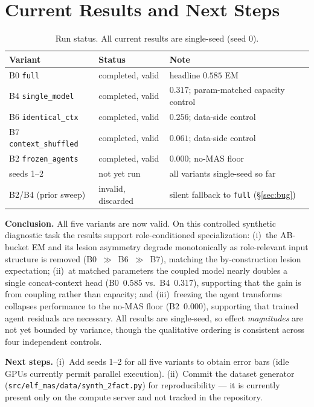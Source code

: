 \documentclass[10pt]{article}
\begin{document}
\section{Current Results and Next Steps}\label{sec:status}
\begin{table}[H]
\centering
\small
\begin{tabular}{@{}l l l@{}}
\toprule
\textbf{Variant} & \textbf{Status} & \textbf{Note} \\
\midrule
B0 \texttt{full}              & completed, valid   & headline $0.585$ EM \\
B4 \texttt{single\_model}     & completed, valid   & $0.317$; param-matched capacity control \\
B6 \texttt{identical\_ctx}    & completed, valid   & $0.256$; data-side control \\
B7 \texttt{context\_shuffled} & completed, valid   & $0.061$; data-side control \\
B2 \texttt{frozen\_agents}    & completed, valid   & $0.000$; no-MAS floor \\
seeds 1--2                    & not yet run        & all variants single-seed so far \\
\midrule
B2/B4 (prior sweep)           & invalid, discarded & silent fallback to \texttt{full} (\S\ref{sec:bug}) \\
\bottomrule
\end{tabular}
\caption{Run status. All current results are single-seed (seed 0).}
\end{table}

\noindent\textbf{Conclusion.} All five variants are now valid. On this controlled synthetic
diagnostic task the results support role-conditioned specialization: (i)~the AB-bucket EM and
its lesion asymmetry degrade monotonically as role-relevant input structure is removed
(B0~$\gg$~B6~$\gg$~B7), matching the by-construction lesion expectation; (ii)~at matched
parameters the coupled model nearly doubles a single concat-context head
(B0~$0.585$ vs.\ B4~$0.317$), supporting that the gain is from coupling rather than capacity;
and (iii)~freezing the agent transforms collapses performance to the no-MAS floor
(B2~$0.000$), supporting that trained agent residuals are necessary. All results are
single-seed, so effect \emph{magnitudes} are not yet bounded by variance, though the
qualitative ordering is consistent across four independent controls.

\noindent\textbf{Next steps.} (i)~Add seeds 1--2 for all five variants to obtain error bars
(idle GPUs currently permit parallel execution). (ii)~Commit the dataset generator
(\texttt{src/elf\_mas/data/synth\_2fact.py}) for reproducibility --- it is currently present
only on the compute server and not tracked in the repository.
\end{document}
